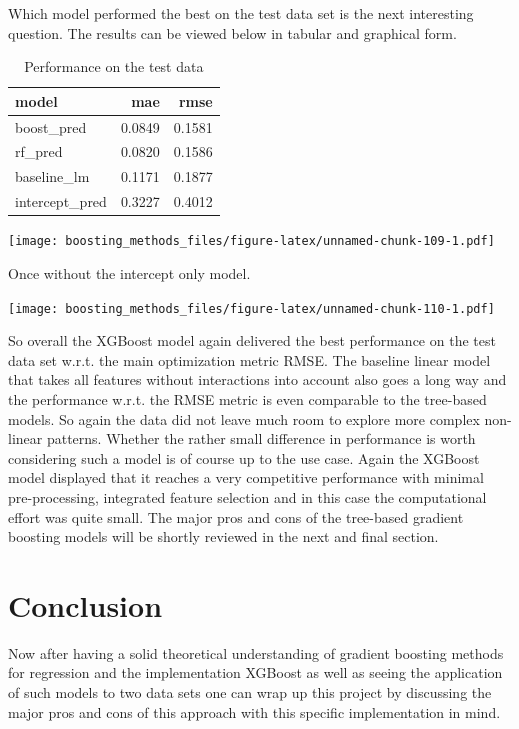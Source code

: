 \documentclass[
]{book}
\begin{document}
Which model performed the best on the test data set is the next interesting question. The results can be viewed below in tabular and graphical form.

\begin{table}

\caption{\label{tab:perfIns}Performance on the test data}
\centering
\begin{tabular}[t]{lrr}
\toprule
model & mae & rmse\\
\midrule
boost\_pred & 0.0849 & 0.1581\\
rf\_pred & 0.0820 & 0.1586\\
baseline\_lm & 0.1171 & 0.1877\\
intercept\_pred & 0.3227 & 0.4012\\
\bottomrule
\end{tabular}
\end{table}

\texttt{[image: boosting\_methods\_files/figure-latex/unnamed-chunk-109-1.pdf]}

Once without the intercept only model.

\texttt{[image: boosting\_methods\_files/figure-latex/unnamed-chunk-110-1.pdf]}

So overall the XGBoost model again delivered the best performance on the test data set w.r.t. the main optimization metric RMSE. The baseline linear model that takes all features without interactions into account also goes a long way and the performance w.r.t. the RMSE metric is even comparable to the tree-based models. So again the data did not leave much room to explore more complex non-linear patterns. Whether the rather small difference in performance is worth considering such a model is of course up to the use case. Again the XGBoost model displayed that it reaches a very competitive performance with minimal pre-processing, integrated feature selection and in this case the computational effort was quite small. The major pros and cons of the tree-based gradient boosting models will be shortly reviewed in the next and final section.

\hypertarget{conclusion}{%
\chapter{Conclusion}\label{conclusion}}

Now after having a solid theoretical understanding of gradient boosting methods for regression and the implementation XGBoost as well as seeing the application of such models to two data sets one can wrap up this project by discussing the major pros and cons of this approach with this specific implementation in mind.
\end{document}
